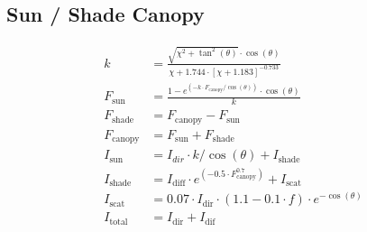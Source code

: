 \documentclass[12pt]{report}
\begin{document}
\subsection*{Sun / Shade Canopy}
\begin{align}
 k &= \frac{\sqrt{\chi^2 + \tan^2(\theta)} \cdot \cos(\theta)}{\chi + 1.744 \cdot[\chi + 1.183]^{-0.733}} \label{eqn:k} \\
 F_{\text{sun}} &= \frac{1 - e^{(-k\cdot F_{\text{canopy}}/\cos(\theta))}\cdot \cos(\theta)}{k} \label{eqn:Fsun} \\
 F_{\text{shade}} &= F_{\text{canopy}} - F_{\text{sun}} \label{eqn:Fshade} \\
 F_{\text{canopy}} &= F_{\text{sun}} + F_{\text{shade}} \label{eqn:Fcanopy} \\
 I_{\text{sun}} &= I_{dir} \cdot k / \cos(\theta) + I_{\text{shade}} \label{eqn:Isun} \\
 I_{\text{shade}} &= I_{\text{diff}} \cdot e^{(-0.5 \cdot F_{\text{canopy}}^{0.7})} + I_{\text{scat}} \label{eqn:Ishade} \\
 I_{\text{scat}} &= 0.07 \cdot I_{\text{dir}} \cdot (1.1 - 0.1 \cdot f)\cdot e^{-\cos(\theta)} \label{eqn:Iscat} \\
 I_{\text{total}} &= I_{\text{dir}} + I_{\text{dif}} \label{eqn:Itotal} \\
\end{align}
\end{document}
